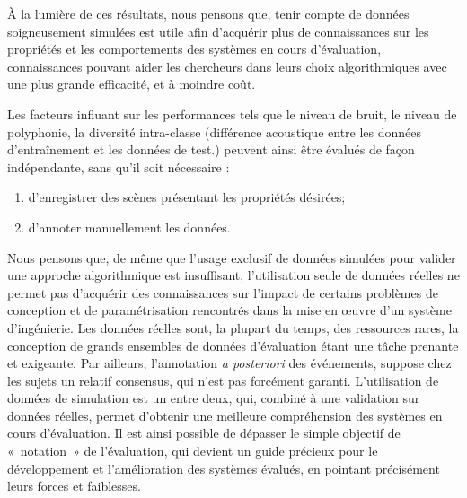 À la lumière de ces résultats, nous pensons que, tenir compte de données soigneusement simulées est utile afin d'acquérir plus de connaissances sur les propriétés et les comportements des systèmes en cours d'évaluation, connaissances pouvant aider les chercheurs dans leurs choix algorithmiques avec une plus grande efficacité, et à moindre coût.  

Les facteurs influant sur les performances tels que le niveau de bruit, le niveau de polyphonie, la diversité intra-classe (différence acoustique entre les données d’entraînement et les données de test.) peuvent ainsi être évalués de façon indépendante, sans qu'il soit nécessaire :

\begin{enumerate}
\item d'enregistrer des scènes présentant les propriétés désirées;
\item d'annoter manuellement les données.
\end{enumerate}

Nous pensons que, de même que l'usage exclusif de données simulées pour valider une approche algorithmique est insuffisant, l'utilisation seule de données réelles ne permet pas d'acquérir des connaissances sur l'impact de certains problèmes de conception et de paramétrisation rencontrés dans la mise en œuvre d'un système d'ingénierie. Les données réelles sont, la plupart du temps, des ressources rares, la conception  de grands ensembles de données d'évaluation étant une tâche prenante et exigeante. Par ailleurs, l'annotation \emph{a posteriori} des événements, suppose chez les sujets un relatif consensus, qui n'est pas forcément garanti. L'utilisation de données de simulation est un entre deux, qui, combiné à une validation sur données réelles, permet d'obtenir une meilleure compréhension des systèmes en cours d'évaluation. Il est ainsi possible de dépasser le simple objectif de «~notation~» de l'évaluation, qui devient un guide précieux pour le développement et l'amélioration des systèmes évalués, en pointant précisément leurs forces et faiblesses.





